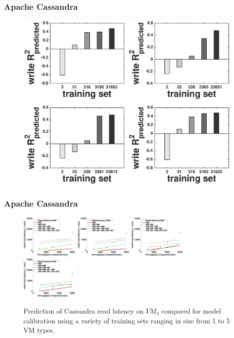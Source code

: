 \documentclass{beamer}
\begin{document}
\begin{frame}
\frametitle{Apache Cassandra}
  \begin{figure}
    \centering
    \includegraphics[scale = 0.4]{cassandra_bar_write_avg_latency.eps}
  \end{figure}
\end{frame}

\begin{frame}
\frametitle{Apache Cassandra}
\begin{figure}
\includegraphics[width=0.25\textwidth]{cassandra_fit_read_avg_latency_m3_2x_m3__r3_2x_m3_x_r3_x_r3_.eps}
\includegraphics[width=0.25\textwidth]{cassandra_fit_read_avg_latency_m3_2x_m3__r3_2x_r3_x_m3_x_r3_.eps}
\includegraphics[width=0.25\textwidth]{cassandra_fit_read_avg_latency_r3_x_m3__r3_2x_m3_2x_m3_x_r3_.eps}
\includegraphics[width=0.25\textwidth]{cassandra_fit_read_avg_latency_r3_x_r3_2x_m3__m3_2x_m3_x_r3_.eps}
\caption{Prediction of Cassandra read latency on $VM_4$ compared for model calibration using a variety of training sets ranging in size from 1 to 5 VM types.}
\end{figure}
\end{frame}
\end{document}
